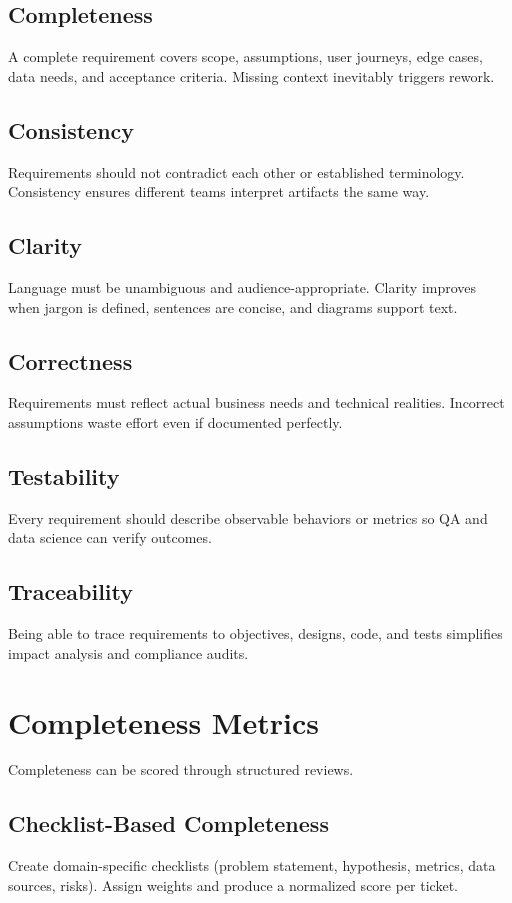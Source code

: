 \subsection{Completeness}
A complete requirement covers scope, assumptions, user journeys, edge cases, data needs, and acceptance criteria. Missing context inevitably triggers rework.

\subsection{Consistency}
Requirements should not contradict each other or established terminology. Consistency ensures different teams interpret artifacts the same way.

\subsection{Clarity}
Language must be unambiguous and audience-appropriate. Clarity improves when jargon is defined, sentences are concise, and diagrams support text.

\subsection{Correctness}
Requirements must reflect actual business needs and technical realities. Incorrect assumptions waste effort even if documented perfectly.

\subsection{Testability}
Every requirement should describe observable behaviors or metrics so QA and data science can verify outcomes.

\subsection{Traceability}
Being able to trace requirements to objectives, designs, code, and tests simplifies impact analysis and compliance audits.

\section{Completeness Metrics}
\label{sec:completeness-metrics}

Completeness can be scored through structured reviews.

\subsection{Checklist-Based Completeness}
Create domain-specific checklists (problem statement, hypothesis, metrics, data sources, risks). Assign weights and produce a normalized score per ticket.

